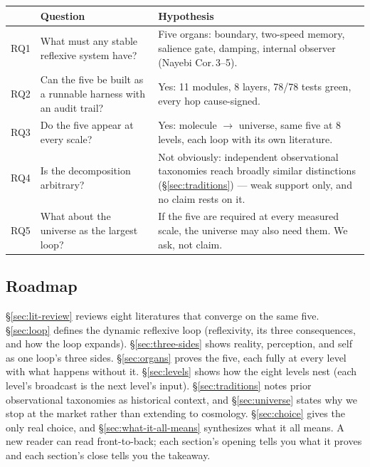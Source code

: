 \documentclass[11pt]{article}
\begin{document}
\begin{center}
\setlength{\tabcolsep}{3pt}
\small
\begin{tabular}{p{0.85cm}p{5.45cm}p{5.45cm}}
\toprule
 & Question & Hypothesis \\
\midrule
RQ1 & What must any stable reflexive system have? & Five organs: boundary, two-speed memory, salience gate, damping, internal observer (Nayebi Cor.\,3--5). \\
RQ2 & Can the five be built as a runnable harness with an audit trail? & Yes: 11 modules, 8 layers, 78/78 tests green, every hop cause-signed. \\
RQ3 & Do the five appear at every scale? & Yes: molecule $\to$\allowbreak{} universe, same five at 8 levels, each loop with its own literature. \\
RQ4 & Is the decomposition arbitrary? & Not obviously: independent observational taxonomies reach broadly similar distinctions (\S\ref{sec:traditions}) --- weak support only, and no claim rests on it. \\
RQ5 & What about the universe as the largest loop? & If the five are required at every measured scale, the universe may also need them. We ask, not claim. \\
\bottomrule
\end{tabular}
\end{center}

\subsection*{Roadmap}

\S\ref{sec:lit-review} reviews eight literatures that converge on the same five. \S\ref{sec:loop} defines the dynamic reflexive loop (reflexivity, its three consequences, and how the loop expands). \S\ref{sec:three-sides} shows reality, perception, and self as one loop's three sides. \S\ref{sec:organs} proves the five, each fully at every level with what happens without it. \S\ref{sec:levels} shows how the eight levels nest (each level's broadcast is the next level's input). \S\ref{sec:traditions} notes prior observational taxonomies as historical context, and \S\ref{sec:universe} states why we stop at the market rather than extending to cosmology. \S\ref{sec:choice} gives the only real choice, and \S\ref{sec:what-it-all-means} synthesizes what it all means. A new reader can read front-to-back; each section's opening tells you what it proves and each section's close tells you the takeaway.
\end{document}
